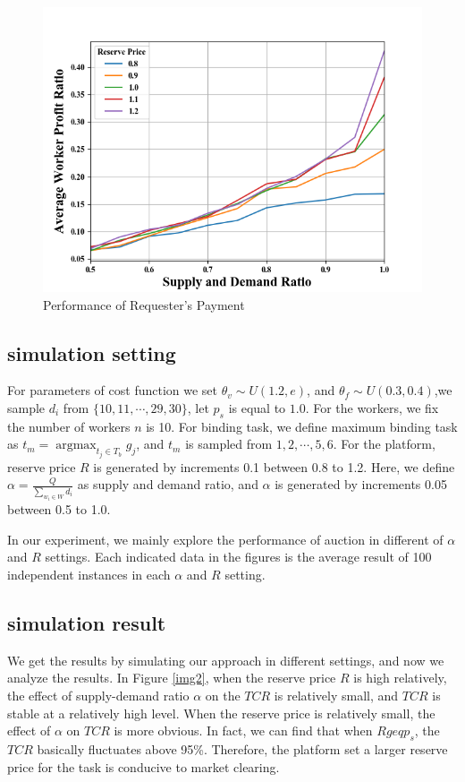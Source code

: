 \begin{figure}
  \centering
  \includegraphics[width=0.6\linewidth]{performance2.png}
  \caption{Performance of Requester's Payment}\label{img4}
\end{figure}
\subsection{simulation setting}
For parameters of cost function we set $\theta_{v} \sim U(1.2,e)$, and $\theta_{f} \sim U(0.3,0.4) $,we sample $d_i$ from $\{10,11,\cdots,29,30\}$, let $p_s$ is equal to $1.0$. For the workers, we fix the number of workers $n$ is 10. For binding task, we define maximum binding task as $t_m = \mathop{\arg\max}_{t_j \in T_b} g_j$, and $t_m$ is sampled from ${1,2,\cdots,5,6}$. For the platform, reserve price $R$ is generated by increments 0.1 between 0.8 to 1.2. Here, we define $\alpha = \frac{Q}{\sum_{w_i \in W} d_i}$ as supply and demand ratio, and $\alpha$ is generated by increments 0.05 between 0.5 to 1.0.

In our experiment, we mainly explore the performance of auction in different of $\alpha$ and $R$ settings. Each indicated data in the ﬁgures is the average result of 100 independent instances in each $\alpha$ and $R$ setting.
\subsection{simulation result}
We get the results by simulating our approach in different settings, and now we analyze the results. In Figure \ref{img2}, when the reserve price $R$ is high relatively, the effect of supply-demand ratio $\alpha$ on the $TCR$ is relatively small, and $TCR$ is stable at a relatively high level. When the reserve price is relatively small, the effect of $\alpha$ on $TCR$ is more obvious. In fact, we can find that when $R geq p_s$, the $TCR$ basically fluctuates above 95\%. Therefore, the platform set a larger reserve price for the task is conducive to market clearing.

